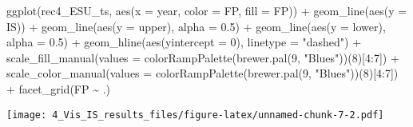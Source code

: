 \documentclass[
]{article}
\newenvironment{Shaded}{\begin{snugshade}}{\end{snugshade}}
\newcommand{\AttributeTok}[1]{\textcolor[rgb]{0.77,0.63,0.00}{#1}}
\newcommand{\DecValTok}[1]{\textcolor[rgb]{0.00,0.00,0.81}{#1}}
\newcommand{\FloatTok}[1]{\textcolor[rgb]{0.00,0.00,0.81}{#1}}
\newcommand{\FunctionTok}[1]{\textcolor[rgb]{0.00,0.00,0.00}{#1}}
\newcommand{\NormalTok}[1]{#1}
\newcommand{\SpecialCharTok}[1]{\textcolor[rgb]{0.00,0.00,0.00}{#1}}
\newcommand{\StringTok}[1]{\textcolor[rgb]{0.31,0.60,0.02}{#1}}
\begin{document}
\begin{Shaded}
\begin{Highlighting}[]
\FunctionTok{ggplot}\NormalTok{(rec4\_ESU\_ts, }\FunctionTok{aes}\NormalTok{(}\AttributeTok{x =}\NormalTok{ year, }\AttributeTok{color =}\NormalTok{ FP, }\AttributeTok{fill =}\NormalTok{ FP)) }\SpecialCharTok{+}
  \FunctionTok{geom\_line}\NormalTok{(}\FunctionTok{aes}\NormalTok{(}\AttributeTok{y =}\NormalTok{ IS)) }\SpecialCharTok{+}
  \FunctionTok{geom\_line}\NormalTok{(}\FunctionTok{aes}\NormalTok{(}\AttributeTok{y =}\NormalTok{ upper), }\AttributeTok{alpha =} \FloatTok{0.5}\NormalTok{) }\SpecialCharTok{+}
  \FunctionTok{geom\_line}\NormalTok{(}\FunctionTok{aes}\NormalTok{(}\AttributeTok{y =}\NormalTok{ lower), }\AttributeTok{alpha =} \FloatTok{0.5}\NormalTok{) }\SpecialCharTok{+}
  \FunctionTok{geom\_hline}\NormalTok{(}\FunctionTok{aes}\NormalTok{(}\AttributeTok{yintercept =} \DecValTok{0}\NormalTok{),}
             \AttributeTok{linetype =} \StringTok{"dashed"}\NormalTok{) }\SpecialCharTok{+}
    \FunctionTok{scale\_fill\_manual}\NormalTok{(}\AttributeTok{values =} \FunctionTok{colorRampPalette}\NormalTok{(}\FunctionTok{brewer.pal}\NormalTok{(}\DecValTok{9}\NormalTok{, }\StringTok{"Blues"}\NormalTok{))(}\DecValTok{8}\NormalTok{)[}\DecValTok{4}\SpecialCharTok{:}\DecValTok{7}\NormalTok{]) }\SpecialCharTok{+}
  \FunctionTok{scale\_color\_manual}\NormalTok{(}\AttributeTok{values =} \FunctionTok{colorRampPalette}\NormalTok{(}\FunctionTok{brewer.pal}\NormalTok{(}\DecValTok{9}\NormalTok{, }\StringTok{"Blues"}\NormalTok{))(}\DecValTok{8}\NormalTok{)[}\DecValTok{4}\SpecialCharTok{:}\DecValTok{7}\NormalTok{]) }\SpecialCharTok{+}
     \FunctionTok{facet\_grid}\NormalTok{(FP }\SpecialCharTok{\textasciitilde{}}\NormalTok{ .)}
\end{Highlighting}
\end{Shaded}

\texttt{[image: 4\_Vis\_IS\_results\_files/figure-latex/unnamed-chunk-7-2.pdf]}
\end{document}
